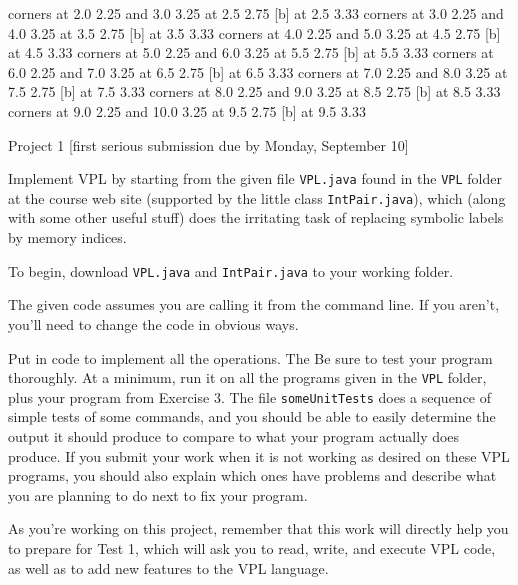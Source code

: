 \putrectangle corners at 2.0 2.25 and 3.0 3.25
 at 2.5 2.75
 [b] at 2.5 3.33
\putrectangle corners at 3.0 2.25 and 4.0 3.25
 at 3.5 2.75
 [b] at 3.5 3.33
\putrectangle corners at 4.0 2.25 and 5.0 3.25
 at 4.5 2.75
 [b] at 4.5 3.33
\putrectangle corners at 5.0 2.25 and 6.0 3.25
 at 5.5 2.75
 [b] at 5.5 3.33
\putrectangle corners at 6.0 2.25 and 7.0 3.25
 at 6.5 2.75
 [b] at 6.5 3.33
\putrectangle corners at 7.0 2.25 and 8.0 3.25
 at 7.5 2.75
 [b] at 7.5 3.33
\putrectangle corners at 8.0 2.25 and 9.0 3.25
 at 8.5 2.75
 [b] at 8.5 3.33
\putrectangle corners at 9.0 2.25 and 10.0 3.25
 at 9.5 2.75
 [b] at 9.5 3.33
\endpicture
\border

\vfil\eject

{\bigboldfont Project 1} [first serious submission due by Monday, September 10]
\medskip

Implement VPL by starting from the given file {\tt VPL.java} found in the {\tt VPL} folder at the course web site
 (supported by the little class {\tt IntPair.java}),
which (along with some other useful stuff) does the irritating task of replacing
symbolic labels by memory indices.
\medskip

To begin, download {\tt VPL.java}  and {\tt IntPair.java} to your working folder.
\medskip

The given code assumes you are calling it from the command line.  If you aren't, you'll need to
change the code in obvious ways.
\medskip

Put in code to implement all the operations.  The
Be sure to test your program thoroughly. 
 At a minimum, run it on all the programs given in the {\tt VPL} folder,
 plus your program from Exercise 3.  The file {\tt someUnitTests}
 does a sequence of simple tests of some commands, and you should be able to easily
 determine the output it should produce to compare to what your program actually does produce.
 If you submit your work when it is not working as desired on these VPL programs,
 you should also explain which ones have problems and describe what you are planning to
 do next to fix your program.
 \medskip

As you're working on this project, remember that this work will directly help you to
prepare for Test 1, 
which will ask you to read, write, and execute VPL code, as well as to
add new features to the VPL language.
\medskip

